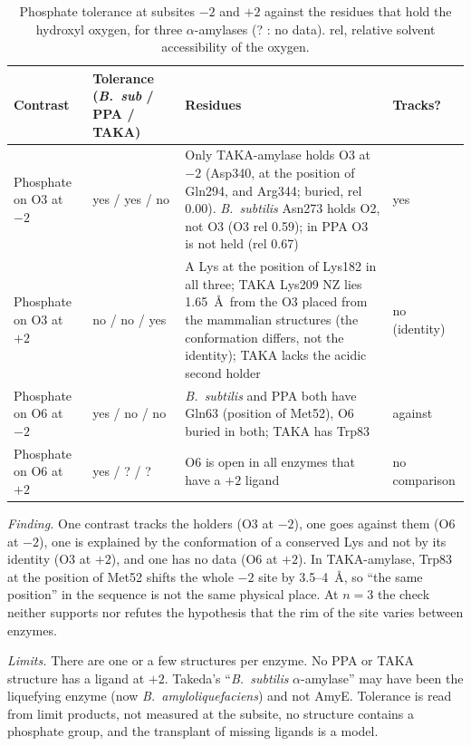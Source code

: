 \documentclass[preprint,12pt]{elsarticle}
\begin{document}
\begin{table}[h]\centering\scriptsize\setlength{\tabcolsep}{3pt}
\caption{Phosphate tolerance at subsites $-2$ and $+2$ against the residues that hold the hydroxyl oxygen, for three $\alpha$-amylases (? : no data). rel, relative solvent accessibility of the oxygen.}
\label{tab:rim}
\begin{tabular}{>{\raggedright\arraybackslash}p{1.9cm}>{\raggedright\arraybackslash}p{2.4cm}>{\raggedright\arraybackslash}p{6.2cm}>{\raggedright\arraybackslash}p{1.5cm}}
\toprule
Contrast & Tolerance (\emph{B.\ sub} / PPA / TAKA) & Residues & Tracks?\\
\midrule
Phosphate on O3 at $-2$ & yes / yes / no & Only TAKA-amylase holds O3 at $-2$ (Asp340, at the position of Gln294, and Arg344; buried, rel 0.00). \emph{B.\ subtilis} Asn273 holds O2, not O3 (O3 rel 0.59); in PPA O3 is not held (rel 0.67) & yes\\
Phosphate on O3 at $+2$ & no / no / yes & A Lys at the position of Lys182 in all three; TAKA Lys209 NZ lies 1.65~\AA\ from the O3 placed from the mammalian structures (the conformation differs, not the identity); TAKA lacks the acidic second holder & no (identity)\\
Phosphate on O6 at $-2$ & yes / no / no & \emph{B.\ subtilis} and PPA both have Gln63 (position of Met52), O6 buried in both; TAKA has Trp83 & against\\
Phosphate on O6 at $+2$ & yes / ? / ? & O6 is open in all enzymes that have a $+2$ ligand & no comparison\\
\bottomrule
\end{tabular}
\end{table}

\emph{Finding.} One contrast tracks the holders (O3 at $-2$), one goes against them (O6 at $-2$), one is explained by the
conformation of a conserved Lys and not by its identity (O3 at $+2$), and one has no data (O6 at $+2$). In TAKA-amylase,
Trp83 at the position of Met52 shifts the whole $-2$ site by 3.5--4~\AA, so ``the same position'' in the sequence is not the
same physical place. At $n=3$ the check neither supports nor refutes the hypothesis that the rim of the site varies
between enzymes.

\emph{Limits.} There are one or a few structures per enzyme. No PPA or TAKA structure has a ligand at $+2$. Takeda's
``\emph{B.\ subtilis} $\alpha$-amylase'' may have been the liquefying enzyme (now \emph{B.\ amyloliquefaciens}) and not
AmyE. Tolerance is read from limit products, not measured at the subsite, no structure contains a phosphate group, and the
transplant of missing ligands is a model.
\end{document}
